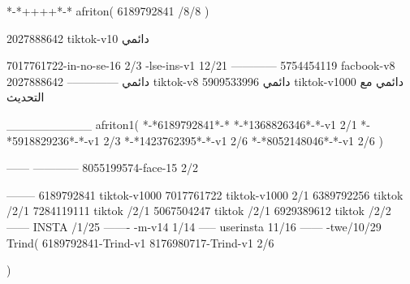 *-*++++*-*
afriton(
6189792841 /8/8
)

2027888642 tiktok-v10
دائمي

7017761722-in-no-se-16 2/3
-lse-ins-v1 12/21
------------
5754454119 facbook-v8
دائمي
--------------
2027888642 tiktok-v8
دائمي
5909533996 tiktok-v1000
دائمي مع التحديث

__________
afriton1(
*-*6189792841*-*
*-*1368826346*-*-v1 2/1
*-*5918829236*-*-v1 2/3
*-*1423762395*-*-v1 2/6
*-*8052148046*-*-v1 2/6
)

------
------------
8055199574-face-15 2/2

--------
6189792841 tiktok-v1000
7017761722 tiktok-v1000 2/1
6389792256 tiktok /2/1
7284119111 tiktok /2/1
5067504247 tiktok /2/1
6929389612 tiktok /2/2
------
 INSTA /1/25
-------
-m-v14 1/14
-----
userinsta 11/16
------
-twe/10/29
Trind(
6189792841-Trind-v1 
8176980717-Trind-v1 2/6

)

